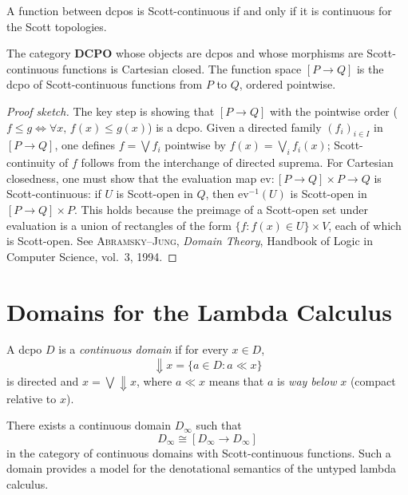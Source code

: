 \begin{proposition}
A function between dcpos is Scott-continuous if and only if it is continuous for the
Scott topologies.
\end{proposition}

\begin{theorem}
The category $\mathbf{DCPO}$ whose objects are dcpos and whose morphisms are
Scott-continuous functions is Cartesian closed. The function space $[P \to Q]$ is the dcpo
of Scott-continuous functions from $P$ to $Q$, ordered pointwise.
\end{theorem}

\begin{proof}[Proof sketch]
The key step is showing that $[P \to Q]$ with the pointwise order
($f \leq g \iff \forall x,\, f(x) \leq g(x)$) is a dcpo. Given a directed family
$(f_i)_{i \in I}$ in $[P \to Q]$, one defines $f = \bigvee f_i$ pointwise by
$f(x) = \bigvee_i f_i(x)$; Scott-continuity of $f$ follows from the interchange of
directed suprema. For Cartesian closedness, one must show that the evaluation map
$\mathrm{ev} \colon [P \to Q] \times P \to Q$ is Scott-continuous: if $U$ is
Scott-open in $Q$, then $\mathrm{ev}^{-1}(U)$ is Scott-open in $[P \to Q] \times P$.
This holds because the preimage of a Scott-open set under evaluation is a union of
rectangles of the form $\{f : f(x) \in U\} \times V$, each of which is Scott-open.
See \textsc{Abramsky--Jung}, \emph{Domain Theory}, Handbook of Logic in Computer
Science, vol.~3, 1994.
\end{proof}

\section{Domains for the Lambda Calculus}

\begin{definition}
A dcpo $D$ is a \emph{continuous domain} if for every $x \in D$,
\[
  {\Downarrow} x = \{ a \in D : a \ll x \}
\]
is directed and $x = \bigvee {\Downarrow} x$, where $a \ll x$ means that $a$ is
\emph{way below} $x$ (compact relative to $x$).
\end{definition}

\begin{theorem}
\label{thm:scott-model}
There exists a continuous domain $D_\infty$ such that
\[
  D_\infty \cong [D_\infty \to D_\infty]
\]
in the category of continuous domains with Scott-continuous functions. Such a domain
provides a model for the denotational semantics of the untyped lambda calculus.
\end{theorem}

